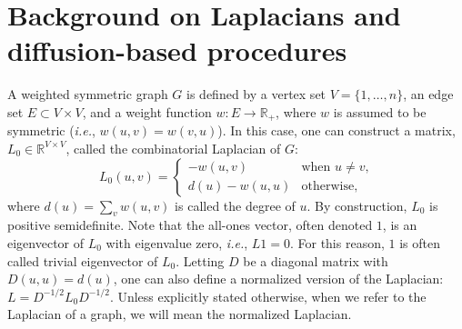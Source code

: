 \documentclass[12pt]{article}
\newcommand{\reals}{\mathbb{R}}
\theoremstyle{plain}
\begin{document}
\vspace{-4mm}
\section{Background on Laplacians and diffusion-based procedures}
\label{S:introduction}
\vspace{-3mm}

A weighted symmetric graph $G$ is defined by a vertex set 
$V = \{ 1, \dotsc, n \}$, an edge set $E \subset V \times V$, 
and a weight function $w : E \to \reals_+$, where $w$ is assumed to 
be symmetric 
(\emph{i.e.}, $w(u,v) = w(v,u)$).  
In this case, one can construct a matrix, $L_0 \in \reals^{V \times V}$, 
called the combinatorial Laplacian of $G$:
\[
  L_0(u,v)
  =
  \begin{cases}
    - w(u,v) & \text{when $u \neq v$,} \\
    d(u) - w(u,u) & \text{otherwise,}
  \end{cases}
\]
where $d(u) = \sum_{v} w(u,v)$ is called the degree of $u$.
By construction, $L_0$ is positive semidefinite.  
Note that the all-ones vector, often denoted $1$, is an eigenvector of 
$L_0$ with eigenvalue zero, \emph{i.e.}, $L 1 = 0$.
For this reason, $1$ is often called trivial eigenvector of $L_0$.  
Letting $D$ be a diagonal matrix with $D(u,u) = d(u)$, one can also define 
a normalized version of the Laplacian: $L = D^{-1/2} L_0 D^{-1/2}$.  
Unless explicitly stated otherwise, when we refer to the Laplacian of a 
graph, we will mean the normalized Laplacian.
\end{document}
